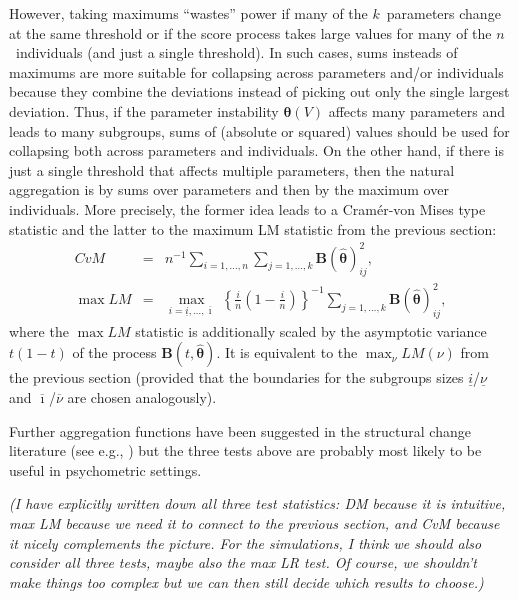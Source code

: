 \documentclass[man]{apa}
\newcommand{\fixme}[1]{\emph{\marginpar{FIXME} (#1)}}
\begin{document}
However, taking maximums ``wastes'' power if many of the $k$~parameters change
at the same threshold or if the score process takes large values for
many of the $n$~individuals (and just a single threshold). In such
cases, sums insteads of maximums are more suitable for collapsing across
parameters and/or individuals because they combine the deviations instead of
picking out only the single largest deviation. Thus, if the parameter instability
${\bm \theta}(V)$ affects many parameters and leads to many subgroups, sums
of (absolute or squared) values should be used for collapsing both across
parameters and individuals. On the other hand, if there is just a single
threshold that affects multiple parameters, then the natural aggregation
is by sums over parameters and then by the maximum over individuals.
More precisely, the former idea leads to a Cram{\'e}r-von Mises type
statistic and the latter to the maximum LM statistic from the previous section:
\begin{eqnarray}
    \label{eq:cvm}
    \mathit{CvM}     & = & n^{-1} \sum_{i = 1,\dots, n} \sum_{j = 1, \dots, k} {\bm B}(\hat {\bm \theta})_{ij}^2, \\
    \label{eq:maxlm}
    \max \mathit{LM} & = & \max_{i = \underline{i}, \dots, \overline{\imath}} ~
      \left\{ \frac{i}{n} \left( 1 - \frac{i}{n} \right) \right\}^{-1}
      \sum_{j = 1, \dots, k} {\bm B}(\hat {\bm \theta})_{ij}^2,
\end{eqnarray}
where the $\max \mathit{LM}$ statistic is additionally scaled by the
asymptotic variance $t (1 - t)$ of the process ${\bm B}(t, \hat {\bm \theta})$.
It is equivalent to the $\max_\nu \mathit{LM}(\nu)$ from the previous
section (provided that the boundaries for the subgroups sizes $\underline{i}$/$\underline{\nu}$
and $\overline{\imath}$/$\overline{\nu}$ are chosen analogously).

Further aggregation functions have been suggested in the structural
change literature (see e.g., ) but the three
tests above are probably most likely to be useful in psychometric settings.

\fixme{I have explicitly written down all three test statistics: DM because it is
intuitive, max LM because we need it to connect to the previous section, and CvM
because it nicely complements the picture. For the simulations, I think we should
also consider all three tests, maybe also the max LR test. Of course, we shouldn't
make things too complex but we can then still decide which results to choose.}
\end{document}
